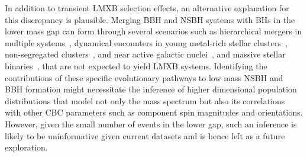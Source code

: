 \documentclass[modern]{aastex631}
\begin{document}
In addition to transient LMXB selection effects, an alternative explanation for this discrepancy is plausible. Merging BBH and NSBH systems with BHs in the lower mass gap can form through several scenarios such as hierarchical mergers in multiple systems~\citep{Lu:2020gfh, Liu:2020gif}, dynamical encounters in young metal-rich stellar clusters~\citep{ArcaSedda:2021zmm}, non-segregated clusters~\citep{Clausen:2014ksa, Fragione:2020wac, Rastello:2020sru}, and near active galactic nuclei~\citep{McKernan:2020lgr, Yang:2020xyi}, and massive stellar binaries~\citep{Antoniadis:2021dhe}, that are not expected to yield LMXB systems. Identifying the contributions of these specific evolutionary pathways to low mass NSBH and BBH formation might necessitate the inference of higher dimensional population distributions that model not only the mass spectrum but also its correlations with other CBC parameters such as component spin magnitudes and orientations. However, given the small number of events in the lower gap, such an inference is likely to be uninformative given current datasets and is hence left as a future exploration.
\end{document}
